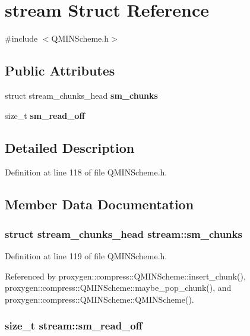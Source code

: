 \section{stream Struct Reference}
\label{structstream}


{\ttfamily \#include $<$Q\+M\+I\+N\+Scheme.\+h$>$}

\subsection*{Public Attributes}
\begin{DoxyCompactItemize}
\item 
struct stream\+\_\+chunks\+\_\+head {\bf sm\+\_\+chunks}
\item 
size\+\_\+t {\bf sm\+\_\+read\+\_\+off}
\end{DoxyCompactItemize}


\subsection{Detailed Description}


Definition at line 118 of file Q\+M\+I\+N\+Scheme.\+h.



\subsection{Member Data Documentation}
\subsubsection[{sm\+\_\+chunks}]{\setlength{\rightskip}{0pt plus 5cm}struct stream\+\_\+chunks\+\_\+head stream\+::sm\+\_\+chunks}\label{structstream_add7faee26426fcb1e3d977e45dd8d7f7}


Definition at line 119 of file Q\+M\+I\+N\+Scheme.\+h.



Referenced by proxygen\+::compress\+::\+Q\+M\+I\+N\+Scheme\+::insert\+\_\+chunk(), proxygen\+::compress\+::\+Q\+M\+I\+N\+Scheme\+::maybe\+\_\+pop\+\_\+chunk(), and proxygen\+::compress\+::\+Q\+M\+I\+N\+Scheme\+::\+Q\+M\+I\+N\+Scheme().

\subsubsection[{sm\+\_\+read\+\_\+off}]{\setlength{\rightskip}{0pt plus 5cm}size\+\_\+t stream\+::sm\+\_\+read\+\_\+off}\label{structstream_ae02f5ad92ddaf8bc5c18690cc85fa723}


